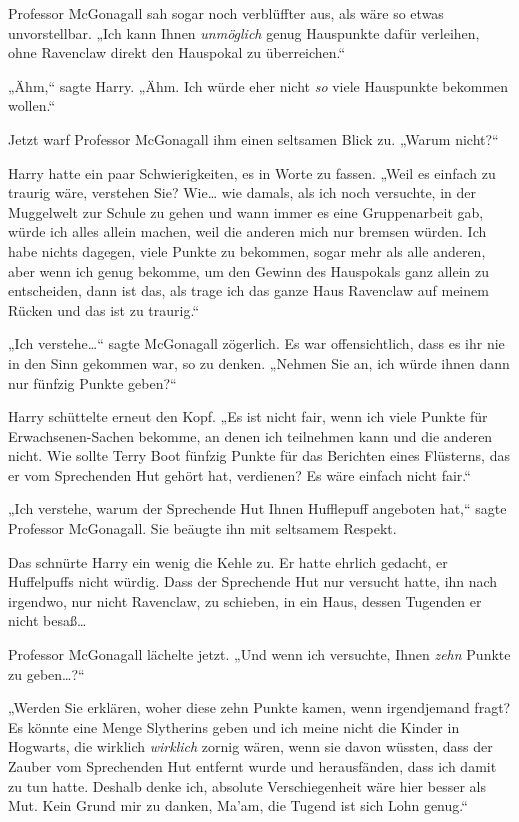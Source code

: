 {Professor McGonagall sah sogar noch verblüffter aus, als wäre so etwas unvorstellbar. „Ich kann Ihnen \emph{unmöglich} genug Hauspunkte dafür verleihen, ohne Ravenclaw direkt den Hauspokal zu überreichen.“

„Ähm,“ sagte Harry. „Ähm. Ich würde eher nicht \emph{so} viele Hauspunkte bekommen wollen.“

Jetzt warf Professor McGonagall ihm einen seltsamen Blick zu. „Warum nicht?“

Harry hatte ein paar Schwierigkeiten, es in Worte zu fassen. „Weil es einfach zu traurig wäre, verstehen Sie? Wie… wie damals, als ich noch versuchte, in der Muggelwelt zur Schule zu gehen und wann immer es eine Gruppenarbeit gab, würde ich alles allein machen, weil die anderen mich nur bremsen würden. Ich habe nichts dagegen, viele Punkte zu bekommen, sogar mehr als alle anderen, aber wenn ich genug bekomme, um den Gewinn des Hauspokals ganz allein zu entscheiden, dann ist das, als trage ich das ganze Haus Ravenclaw auf meinem Rücken und das ist zu traurig.“

„Ich verstehe…“ sagte McGonagall zögerlich. Es war offensichtlich, dass es ihr nie in den Sinn gekommen war, so zu denken. „Nehmen Sie an, ich würde ihnen dann nur fünfzig Punkte geben?“

Harry schüttelte erneut den Kopf. „Es ist nicht fair, wenn ich viele Punkte für Erwachsenen-Sachen bekomme, an denen ich teilnehmen kann und die anderen nicht. Wie sollte Terry Boot fünfzig Punkte für das Berichten eines Flüsterns, das er vom Sprechenden Hut gehört hat, verdienen? Es wäre einfach nicht fair.“

„Ich verstehe, warum der Sprechende Hut Ihnen Hufflepuff angeboten hat,“ sagte Professor McGonagall. Sie beäugte ihn mit seltsamem Respekt.

Das schnürte Harry ein wenig die Kehle zu. Er hatte ehrlich gedacht, er Huffelpuffs nicht würdig. Dass der Sprechende Hut nur versucht hatte, ihn nach irgendwo, nur nicht Ravenclaw, zu schieben, in ein Haus, dessen Tugenden er nicht besaß…

Professor McGonagall lächelte jetzt. „Und wenn ich versuchte, Ihnen \emph{zehn} Punkte zu geben…?“

„Werden Sie erklären, woher diese zehn Punkte kamen, wenn irgendjemand fragt? Es könnte eine Menge Slytherins geben und ich meine nicht die Kinder in Hogwarts, die wirklich \emph{wirklich} zornig wären, wenn sie davon wüssten, dass der Zauber vom Sprechenden Hut entfernt wurde und herausfänden, dass ich damit zu tun hatte. Deshalb denke ich, absolute Verschiegenheit wäre hier besser als Mut. Kein Grund mir zu danken, Ma'am, die Tugend ist sich Lohn genug.“

}
